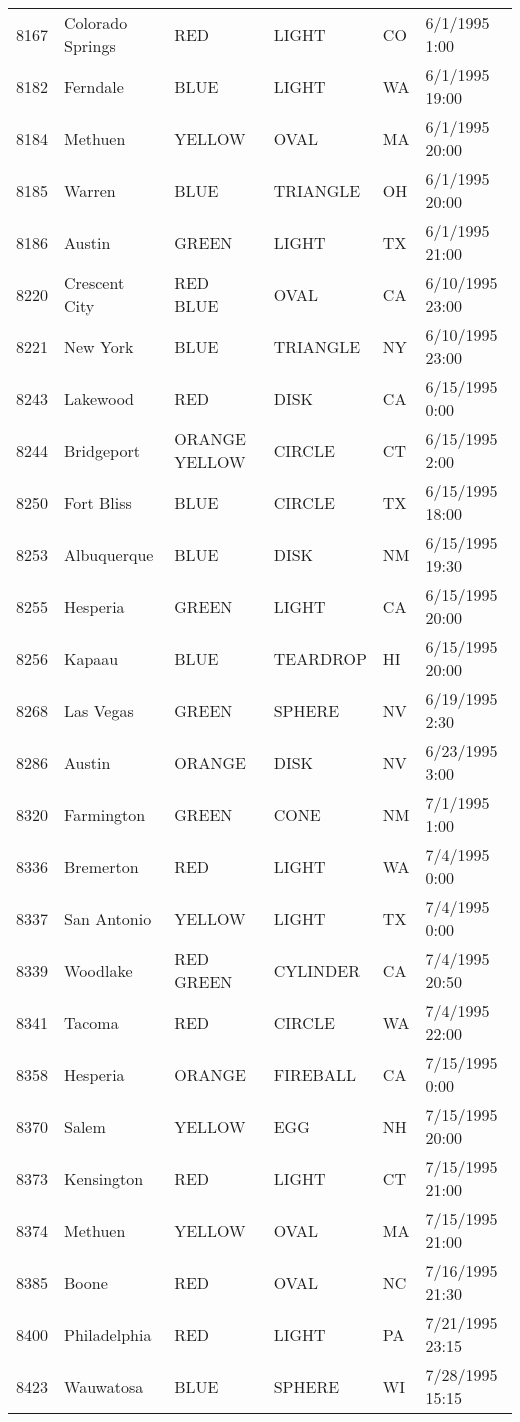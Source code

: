 \begin{tabular}{llllll}
8167 & Colorado Springs & RED & LIGHT & CO & 6/1/1995 1:00 \\
8182 & Ferndale & BLUE & LIGHT & WA & 6/1/1995 19:00 \\
8184 & Methuen & YELLOW & OVAL & MA & 6/1/1995 20:00 \\
8185 & Warren & BLUE & TRIANGLE & OH & 6/1/1995 20:00 \\
8186 & Austin & GREEN & LIGHT & TX & 6/1/1995 21:00 \\
8220 & Crescent City & RED BLUE & OVAL & CA & 6/10/1995 23:00 \\
8221 & New York & BLUE & TRIANGLE & NY & 6/10/1995 23:00 \\
8243 & Lakewood & RED & DISK & CA & 6/15/1995 0:00 \\
8244 & Bridgeport & ORANGE YELLOW & CIRCLE & CT & 6/15/1995 2:00 \\
8250 & Fort Bliss & BLUE & CIRCLE & TX & 6/15/1995 18:00 \\
8253 & Albuquerque & BLUE & DISK & NM & 6/15/1995 19:30 \\
8255 & Hesperia & GREEN & LIGHT & CA & 6/15/1995 20:00 \\
8256 & Kapaau & BLUE & TEARDROP & HI & 6/15/1995 20:00 \\
8268 & Las Vegas & GREEN & SPHERE & NV & 6/19/1995 2:30 \\
8286 & Austin & ORANGE & DISK & NV & 6/23/1995 3:00 \\
8320 & Farmington & GREEN & CONE & NM & 7/1/1995 1:00 \\
8336 & Bremerton & RED & LIGHT & WA & 7/4/1995 0:00 \\
8337 & San Antonio & YELLOW & LIGHT & TX & 7/4/1995 0:00 \\
8339 & Woodlake & RED GREEN & CYLINDER & CA & 7/4/1995 20:50 \\
8341 & Tacoma & RED & CIRCLE & WA & 7/4/1995 22:00 \\
8358 & Hesperia & ORANGE & FIREBALL & CA & 7/15/1995 0:00 \\
8370 & Salem & YELLOW & EGG & NH & 7/15/1995 20:00 \\
8373 & Kensington & RED & LIGHT & CT & 7/15/1995 21:00 \\
8374 & Methuen & YELLOW & OVAL & MA & 7/15/1995 21:00 \\
8385 & Boone & RED & OVAL & NC & 7/16/1995 21:30 \\
8400 & Philadelphia & RED & LIGHT & PA & 7/21/1995 23:15 \\
8423 & Wauwatosa & BLUE & SPHERE & WI & 7/28/1995 15:15 \\

\end{tabular}
